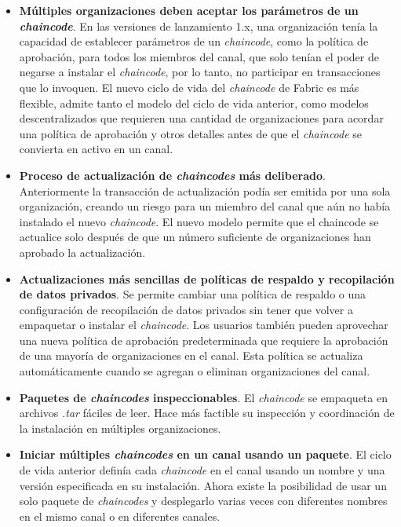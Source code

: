 {\begin{itemize}
\item {\bf M\'ultiples organizaciones deben aceptar los par\'ametros de un \emph{chaincode}}. En las versiones de lanzamiento 1.x, una organizaci\'on ten\'ia la capacidad de establecer par\'ametros de un \emph{chaincode}, como la pol\'itica de aprobaci\'on, para todos los miembros del canal, que solo ten\'ian el poder de negarse a instalar el \emph{chaincode}, por lo tanto, no participar en transacciones que lo invoquen. El nuevo ciclo de vida del \emph{chaincode} de Fabric es m\'as flexible, admite tanto el modelo del ciclo de vida anterior, como modelos descentralizados que requieren una cantidad de organizaciones para acordar una pol\'itica de aprobaci\'on y otros detalles antes de que el \emph{chaincode} se convierta en activo en un canal.

\item {\bf Proceso de actualizaci\'on de \emph{chaincodes} m\'as deliberado}. Anteriormente la transacci\'on de actualizaci\'on pod\'ia ser emitida por una sola organizaci\'on, creando un riesgo para un miembro del canal que a\'un no hab\'ia instalado el nuevo \emph{chaincode}. El nuevo modelo permite que el chaincode se actualice solo despu\'es de que un n\'umero suficiente de organizaciones han aprobado la actualizaci\'on.

\item {\bf Actualizaciones m\'as sencillas de pol\'iticas de respaldo y recopilaci\'on de datos privados}. Se permite cambiar una pol\'itica de respaldo o una configuraci\'on de recopilaci\'on de datos privados sin tener que volver a empaquetar o instalar el \emph{chaincode}. Los usuarios tambi\'en pueden aprovechar una nueva pol\'itica de aprobaci\'on predeterminada que requiere la aprobaci\'on de una mayor\'ia de organizaciones en el canal. Esta pol\'itica se actualiza autom\'aticamente cuando se agregan o eliminan organizaciones del canal.

\item {\bf Paquetes de \emph{chaincodes} inspeccionables}. El \emph{chaincode} se empaqueta en archivos \emph{.tar} f\'aciles de leer. Hace m\'as factible su inspecci\'on y coordinaci\'on de la instalaci\'on en m\'ultiples organizaciones.

\item {\bf Iniciar m\'ultiples \emph{chaincodes} en un canal usando un paquete}. El ciclo de vida anterior defin\'ia cada \emph{chaincode} en el canal usando un nombre y una versi\'on especificada en su instalaci\'on. Ahora existe la posibilidad de usar un solo paquete de \emph{chaincodes} y desplegarlo varias veces con diferentes nombres en el mismo canal o en diferentes canales.


\end{itemize}}
